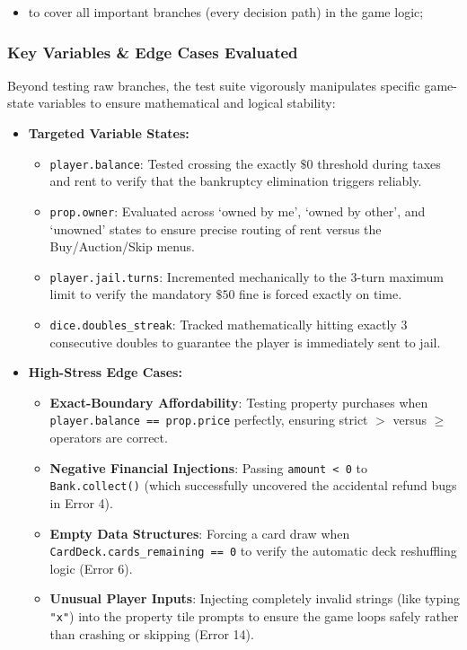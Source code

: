 \documentclass[11pt]{article}
\begin{document}
\begin{itemize}
  \item to cover all important branches (every decision path) in the game logic;
\end{itemize}

\subsubsection*{Key Variables \& Edge Cases Evaluated}
Beyond testing raw branches, the test suite vigorously manipulates specific game-state variables to ensure mathematical and logical stability:

\begin{itemize}
  \item \textbf{Targeted Variable States:}
  \begin{itemize}
      \item \texttt{player.balance}: Tested crossing the exactly $\$0$ threshold during taxes and rent to verify that the bankruptcy elimination triggers reliably.
      \item \texttt{prop.owner}: Evaluated across `owned by me', `owned by other', and `unowned' states to ensure precise routing of rent versus the Buy/Auction/Skip menus.
      \item \texttt{player.jail.turns}: Incremented mechanically to the 3-turn maximum limit to verify the mandatory $\$50$ fine is forced exactly on time.
      \item \texttt{dice.doubles\_streak}: Tracked mathematically hitting exactly 3 consecutive doubles to guarantee the player is immediately sent to jail.
  \end{itemize}
  \item \textbf{High-Stress Edge Cases:}
  \begin{itemize}
      \item \textbf{Exact-Boundary Affordability}: Testing property purchases when \texttt{player.balance == prop.price} perfectly, ensuring strict $>$ versus $\geq$ operators are correct.
      \item \textbf{Negative Financial Injections}: Passing \texttt{amount < 0} to \texttt{Bank.collect()} (which successfully uncovered the accidental refund bugs in Error 4).
      \item \textbf{Empty Data Structures}: Forcing a card draw when \texttt{CardDeck.cards\_remaining == 0} to verify the automatic deck reshuffling logic (Error 6).
      \item \textbf{Unusual Player Inputs}: Injecting completely invalid strings (like typing \texttt{"x"}) into the property tile prompts to ensure the game loops safely rather than crashing or skipping (Error 14).
  \end{itemize}
\end{itemize}
\end{document}
